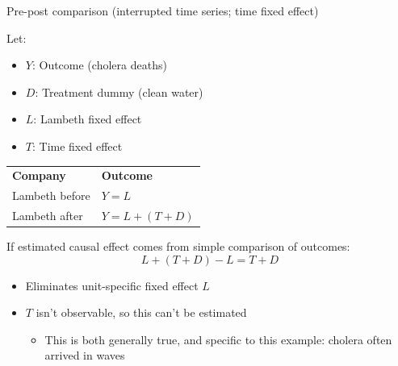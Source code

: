 \documentclass[compress, 8pt]{beamer}
\begin{document}
\begin{frame}{Pre-post comparison (interrupted time series; time fixed effect)}

Let:
\begin{itemize}
    \item $Y$: Outcome (cholera deaths)
    \item $D$: Treatment dummy (clean water)
    \item $L$: Lambeth fixed effect
    \item $T$: Time fixed effect
\end{itemize}
\begin{table}
\begin{tabular}{ll}
\textbf{Company} &\textbf{Outcome} \\
Lambeth before & $Y = L$ \\
Lambeth after & $Y = L + (T + D)$
\end{tabular}
\end{table}
If estimated causal effect comes from simple comparison of outcomes:
\begin{equation*}
    L + (T + D) - L = T + D
\end{equation*}
\begin{itemize}
    \item Eliminates unit-specific fixed effect $L$
    \item $T$ isn't observable, so this can't be estimated
    \begin{itemize}
    \item This is both generally true, and specific to this example: cholera often arrived in waves
\end{itemize}
\end{itemize}




\end{frame}
\end{document}
